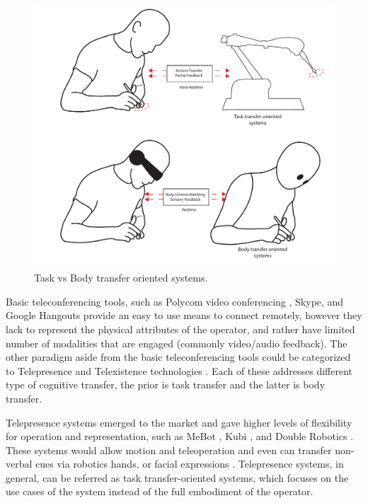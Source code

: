 \begin{figure}[!ht]
  \centering
  \includegraphics[width=1\linewidth]{figures/intro/Teleoperation.pdf}
  \captionsetup{justification=centering}
  \caption{Task vs Body transfer oriented systems. }
  \label{fig:intro-tele}
\end{figure}


Basic teleconferencing tools, such as Polycom video conferencing \cite{rodman2004polycom}, Skype, and Google Hangouts provide an easy to use means to connect remotely, however they lack to represent the physical attributes of the operator, and rather have limited number of modalities that are engaged (commonly video/audio feedback). The other paradigm aside from the basic teleconferencing tools could be categorized to Telepresence and Telexistence technologies . Each of these addresses different type of cognitive transfer, the prior is task transfer and the latter is body transfer.

Telepresence systems emerged to the market and gave higher levels of flexibility for operation and representation, such as MeBot \cite{adalgeirsson2010mebot}, Kubi \cite{kubi2013}, and Double Robotics \cite{robotics2015double}. These systems would allow motion and teleoperation and even can transfer non-verbal cues via robotics hands, or facial expressions \cite{misawa2013livemask}. Telepresence systems, in general, can be referred as task transfer-oriented systems, which focuses on the use cases of the system instead of the full embodiment of the operator.

